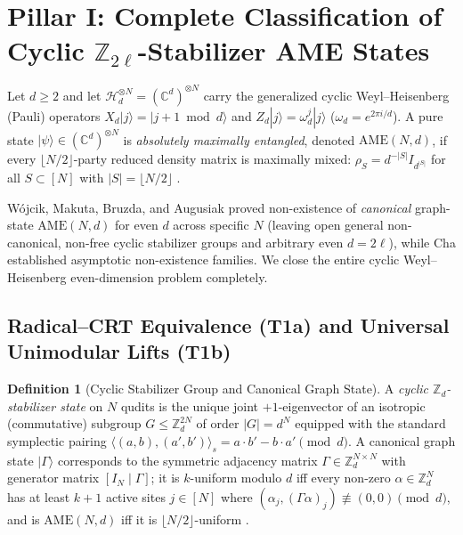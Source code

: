 \documentclass[11pt,reqno]{amsart}
\theoremstyle{definition}
\newtheorem{definition}[theorem]{Definition}
\newcommand{\ZZ}{\mathbb{Z}}
\newcommand{\CC}{\mathbb{C}}
\newcommand{\AME}{\mathrm{AME}}
\begin{document}
\section{Pillar I: Complete Classification of Cyclic \texorpdfstring{$\ZZ_{2\ell}$}{Z\_(2l)}-Stabilizer AME States}
\label{sec:pillar1}

Let $d \ge 2$ and let $\mathcal{H}_d^{\otimes N} = (\CC^d)^{\otimes N}$ carry the
generalized cyclic Weyl--Heisenberg (Pauli) operators $X_d |j\rangle = |j+1 \bmod d\rangle$
and $Z_d |j\rangle = \omega_d^j |j\rangle$ ($\omega_d = e^{2\pi i/d}$). A pure state
$|\psi\rangle \in (\CC^d)^{\otimes N}$ is \emph{absolutely maximally entangled}, denoted
$\AME(N, d)$, if every $\lfloor N/2 \rfloor$-party reduced density matrix is maximally
mixed: $\rho_S = d^{-|S|} I_{d^{|S|}}$ for all $S \subset [N]$ with $|S| = \lfloor N/2 \rfloor$
\cite{scott2004multipartite,helwig2013ame,rajchel2025ame}.

W\'ojcik, Makuta, Bruzda, and Augusiak \cite{wojcik2026ame} proved non-existence of
\emph{canonical} graph-state $\AME(N, d)$ for even $d$ across specific $N$ (leaving open
general non-canonical, non-free cyclic stabilizer groups and arbitrary even $d = 2\ell$),
while Cha \cite{cha2026ame} established asymptotic non-existence families. We close the
entire cyclic Weyl--Heisenberg even-dimension problem completely.

\subsection{Radical--CRT Equivalence (T1a) and Universal Unimodular Lifts (T1b)}

\begin{definition}[Cyclic Stabilizer Group and Canonical Graph State]
A \emph{cyclic $\ZZ_d$-stabilizer state} on $N$ qudits is the unique joint $+1$-eigenvector
of an isotropic (commutative) subgroup $G \le \ZZ_d^{2N}$ of order $|G| = d^N$ equipped
with the standard symplectic pairing $\langle (a,b), (a',b') \rangle_s = a \cdot b' - b \cdot a'
\pmod d$. A canonical graph state $|\Gamma\rangle$ corresponds to the symmetric adjacency
matrix $\Gamma \in \ZZ_d^{N \times N}$ with generator matrix $[I_N \mid \Gamma]$; it is
$k$-uniform modulo $d$ iff every non-zero $\alpha \in \ZZ_d^N$ has at least $k+1$ active
sites $j \in [N]$ where $(\alpha_j, (\Gamma \alpha)_j) \not\equiv (0,0) \pmod d$, and is
$\AME(N, d)$ iff it is $\lfloor N/2 \rfloor$-uniform \cite{helwig2013ame}.
\end{definition}
\end{document}
